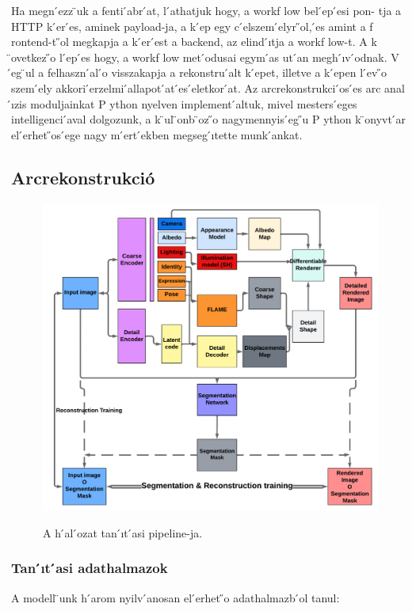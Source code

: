 \documentclass[12pt,a4]{article}
\begin{document}
	Ha megn ́ezz ̈uk a fenti  ́abr ́at, l ́athatjuk hogy, a workf low bel ́ep ́esi pon-
	tja a HTTP k ́er ́es, aminek payload-ja, a k ́ep egy c ́elszem ́elyr ̋ol,  ́es amint a
	f rontend-t ̋ol megkapja a k ́er ́est a backend, az elind ́ıtja a workf low-t. A
	k ̈ovetkez ̋o l ́ep ́es hogy, a workf low met ́odusai egym ́as ut ́an megh ́ıv ́odnak.
	V ́eg ̈ul a felhaszn ́al ́o visszakapja a rekonstru ́alt k ́epet, illetve a k ́epen l ́ev ̋o
	szem ́ely akkori  ́erzelmi  ́allapot ́at  ́es  ́eletkor ́at. Az arcrekonstrukci ́os  ́es arc
	anal ́ızis moduljainkat P ython nyelven implement ́altuk, mivel mesters ́eges
	intelligenci ́aval dolgozunk, a k ̈ul ̈onb ̈oz ̋o nagymennyis ́eg ̋u P ython k ̈onyvt ́ar
	el ́erhet ̋os ́ege nagy m ́ert ́ekben megseg ́ıtette munk ́ankat.
	
	\subsection{Arcrekonstrukció}
	\begin{figure}[h]	
		\centering
		\includegraphics[width=1\linewidth]{pipeline}
		\label{fig:pipeline}
		\caption{  A h ́al ́ozat tan ́ıt ́asi pipeline-ja.}
	\end{figure}

	\subsubsection{Tan ́ıt ́asi adathalmazok}
	A modell ̈unk h ́arom nyilv ́anosan el ́erhet ̋o adathalmazb ́ol tanul:
	
\end{document}
